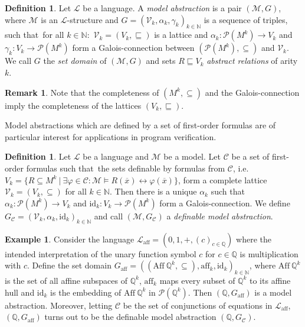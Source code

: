 \documentclass[acmsmall]{acmart}
\theoremstyle{plain}
\theoremstyle{definition}
\newtheorem{definition}[theorem]{Definition}
\newtheorem{example}[theorem]{Example}
\newtheorem{remark}[theorem]{Remark}
\newcommand{\calL}{\mathcal{L}}
\newcommand{\calM}{\mathcal{M}}
\newcommand{\calC}{\mathcal{C}}
\newcommand{\calV}{\mathcal{V}}
\newcommand{\mybar}[1]{\overline{#1}}
\newcommand{\Nat}{\mathbb{N}}
\newcommand{\Rat}{\mathbb{Q}}
\newcommand{\id}{{\mathrm{id}}}
\newcommand{\powset}{\mathcal{P}}
\newcommand{\liff}{\leftrightarrow} %
\newcommand{\Laff}{\calL_{\mathrm{aff}}}
\newcommand{\Aff}{{\mathrm{Aff}~}}
\newcommand{\aff}{{\mathrm{aff}}}
\begin{document}
\begin{definition}
	Let $\calL$ be a language.
	A \emph{model abstraction} is a pair $(\calM,G)$, where $\calM$ is an $\calL$-structure and
	$G = (\mathcal{V}_k,\alpha_k,\gamma_k)_{k \in \Nat}$ is a sequence of triples, such that\ for all
	$k \in \Nat:$ $\mathcal{V}_k =(V_k,\sqsubseteq)$ is a lattice and
	$\alpha_k: \powset(M^k) \rightarrow V_k$ and $\gamma_k: V_k \rightarrow \powset(M^k)$ form a Galois-connection between $(\powset(M^k),\subseteq)$ and $\mathcal{V}_k$. We call $G$ the \emph{set domain} of $(\calM,G)$ and sets $R \sqsubseteq V_k$ \emph{abstract relations} of arity $k$.
\end{definition}

\begin{remark}
	Note that the completeness  of $(M^k,\subseteq)$ and the Galois-connection imply the completeness of the lattices $(V_k,\sqsubseteq)$.%
\end{remark}

Model abstractions which are defined by a set of first-order formulas are of particular interest for
 applications in program verification.

\begin{definition}\label{def.definableModelabstr}
	Let $\calL$ be a language and $\calM$ be a model. Let $\calC$ be a set of first-order formulas such that\ the sets definable by formulas from $\calC$, i.e. $V_k = \{R \subseteq M^k ~|~ \exists \varphi \in \calC: \calM \models R(\mybar{x}) \liff \varphi(\mybar{x}) \}$, form a complete lattice $\calV_k = (V_k,\subseteq)$ for all $k \in \Nat$. Then there is a unique $\alpha_k$ such that $\alpha_k: \powset(M^k) \rightarrow V_k$ and $\id_k: V_k \rightarrow \powset(M^k)$ form a Galois-connection. We define $G_{\calC} = (\calV_k,\alpha_k,\id_k)_{k \in \Nat}$ and call $(\calM,G_{\calC})$ a \emph{definable model abstraction}.
\end{definition}

\begin{example}\label{ex.affone}
	Consider the language $\Laff = (0,1,+,(c)_{c \in \Rat})$ where the intended interpretation of the
	unary function symbol $c$ for $c\in \Rat$ is multiplication with $c$.
	Define the set domain $G_{\aff} = ((\Aff \Rat^k,\subseteq),\aff_k,\id_k)_{k \in \Nat}$, where $\Aff \Rat^k$ is the set of all affine
	subspaces of $\Rat^k$, $\aff_k$ maps every subset of $\Rat^k$ to its affine hull and $\id_k$ is the
	embedding of $\Aff \Rat^k$ in $\powset(\Rat^k)$.
	Then $(\Rat, G_{\aff})$ is a model abstraction. 
	Moreover, letting $\calC$ be the set of conjunctions of equations in $\Laff$, $(\Rat, G_{\aff})$
	turns out to be the definable model abstraction $(\Rat,G_\calC)$.
\end{example}
\end{document}
